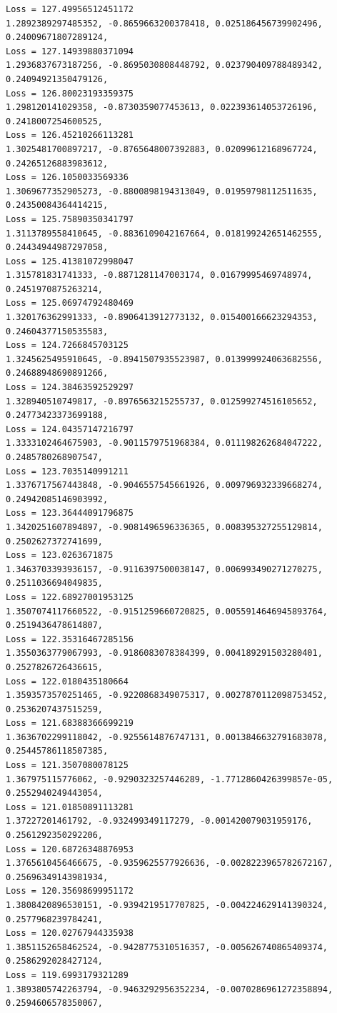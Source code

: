 \documentclass[11pt]{article}
\begin{document}
\begin{Verbatim}[commandchars=\\\{\}]
Loss = 127.49956512451172
1.2892389297485352, -0.8659663200378418, 0.025186456739902496,
0.24009671807289124,
Loss = 127.14939880371094
1.2936837673187256, -0.8695030808448792, 0.023790409788489342,
0.24094921350479126,
Loss = 126.80023193359375
1.298120141029358, -0.8730359077453613, 0.022393614053726196,
0.2418007254600525,
Loss = 126.45210266113281
1.3025481700897217, -0.8765648007392883, 0.02099612168967724,
0.24265126883983612,
Loss = 126.1050033569336
1.3069677352905273, -0.8800898194313049, 0.01959798112511635,
0.24350084364414215,
Loss = 125.75890350341797
1.3113789558410645, -0.8836109042167664, 0.018199242651462555,
0.24434944987297058,
Loss = 125.41381072998047
1.315781831741333, -0.8871281147003174, 0.01679995469748974, 0.2451970875263214,
Loss = 125.06974792480469
1.320176362991333, -0.8906413912773132, 0.015400166623294353,
0.24604377150535583,
Loss = 124.7266845703125
1.3245625495910645, -0.8941507935523987, 0.013999924063682556,
0.24688948690891266,
Loss = 124.38463592529297
1.328940510749817, -0.8976563215255737, 0.012599274516105652,
0.24773423373699188,
Loss = 124.04357147216797
1.3333102464675903, -0.9011579751968384, 0.011198262684047222,
0.2485780268907547,
Loss = 123.7035140991211
1.3376717567443848, -0.9046557545661926, 0.009796932339668274,
0.24942085146903992,
Loss = 123.36444091796875
1.3420251607894897, -0.9081496596336365, 0.008395327255129814,
0.2502627372741699,
Loss = 123.0263671875
1.3463703393936157, -0.9116397500038147, 0.006993490271270275,
0.2511036694049835,
Loss = 122.68927001953125
1.3507074117660522, -0.9151259660720825, 0.0055914646945893764,
0.2519436478614807,
Loss = 122.35316467285156
1.3550363779067993, -0.9186083078384399, 0.004189291503280401,
0.2527826726436615,
Loss = 122.0180435180664
1.3593573570251465, -0.9220868349075317, 0.0027870112098753452,
0.2536207437515259,
Loss = 121.68388366699219
1.3636702299118042, -0.9255614876747131, 0.0013846632791683078,
0.25445786118507385,
Loss = 121.3507080078125
1.367975115776062, -0.9290323257446289, -1.7712860426399857e-05,
0.2552940249443054,
Loss = 121.01850891113281
1.37227201461792, -0.932499349117279, -0.001420079031959176, 0.2561292350292206,
Loss = 120.68726348876953
1.3765610456466675, -0.9359625577926636, -0.0028223965782672167,
0.25696349143981934,
Loss = 120.35698699951172
1.3808420896530151, -0.9394219517707825, -0.004224629141390324,
0.2577968239784241,
Loss = 120.02767944335938
1.3851152658462524, -0.9428775310516357, -0.005626740865409374,
0.2586292028427124,
Loss = 119.6993179321289
1.3893805742263794, -0.9463292956352234, -0.0070286961272358894,
0.2594606578350067,

\end{Verbatim}
\end{document}
